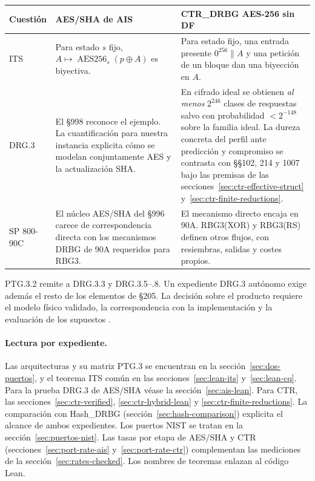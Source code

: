 \documentclass[11pt,a4paper]{article}
\newcommand{\AES}{\operatorname{AES256}}
\begin{document}
\begin{center}
\small
\begin{tabularx}{\linewidth}{@{}lYY@{}}
\toprule
Cuestión & AES/SHA de AIS & CTR\_DRBG AES-256 sin DF \\
\midrule
ITS &
Para estado $s$ fijo, $A\mapsto\AES_s(p\oplus A)$ es biyectiva. &
Para estado fijo, una entrada presente $0^{256}\|A$ y una petición de un
bloque dan una biyección en $A$. \\
DRG.3 &
El §998 reconoce el ejemplo. La cuantificación para nuestra instancia explicita
cómo se modelan conjuntamente AES y la actualización SHA. &
En cifrado ideal se obtienen \emph{al menos} $2^{246}$ clases de respuestas
salvo con probabilidad $<2^{-148}$ sobre la familia ideal. La dureza concreta del perfil ante predicción y compromiso se contrasta con
§§102, 214 y 1007 bajo las premisas de las secciones~\ref{sec:ctr-effective-struct}
y~\ref{sec:ctr-finite-reductions}. \\
SP 800-90C &
El núcleo AES/SHA del §996 carece de correspondencia directa con los mecanismos
DRBG de 90A requeridos para RBG3. &
El mecanismo directo encaja en 90A. RBG3(XOR) y RBG3(RS) definen otros flujos,
con resiembras, salidas y costes propios. \\
\bottomrule
\end{tabularx}
\end{center}
PTG.3.2 remite a DRG.3.3 y DRG.3.5--.8. Un expediente DRG.3
autónomo exige además el resto de los elementos de §205.
La decisión sobre el producto requiere el modelo físico validado, la
correspondencia con la implementación y la evaluación de los supuestos
\cite[§§205--207,380,998,1007 y 1033--1075]{ais}\cite[§6.3]{nist90c}.

\paragraph{Lectura por expediente.}
Las arquitecturas y su matriz PTG.3 se encuentran en la
sección~\ref{sec:dos-puertos}, y el teorema ITS común en las
secciones~\ref{sec:lean-its} y~\ref{sec:lean-cq}. Para la prueba DRG.3
de AES/SHA véase la sección~\ref{sec:ais-lean}. Para CTR, las
secciones~\ref{sec:ctr-verified}, \ref{sec:ctr-hybrid-lean} y
\ref{sec:ctr-finite-reductions}. La comparación con
Hash\_DRBG (sección~\ref{sec:hash-comparison}) explicita el alcance de ambos expedientes. Los puertos NIST se
tratan en la sección~\ref{sec:puertos-nist}. Las tasas por
etapa de AES/SHA y CTR (secciones~\ref{sec:port-rate-ais} y~\ref{sec:port-rate-ctr})
complementan las mediciones de la
sección~\ref{sec:rates-checked}. Los nombres de teoremas enlazan al código Lean.
\end{document}

